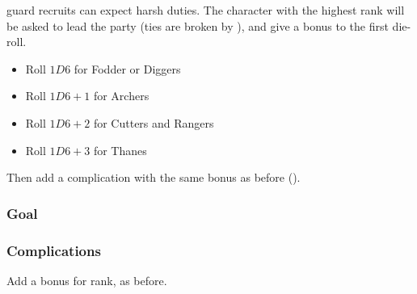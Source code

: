 \begin{multicols}{2}

\noindent
\Gls{guard} recruits can expect harsh duties.
The character with the highest rank will be asked to lead the party (ties are broken by ), and give a bonus to the first die-roll.

\begin{itemize}
  \item
  Roll $1D6$ for Fodder or Diggers
  \item
  Roll $1D6+1$ for Archers
  \item
  Roll $1D6+2$ for Cutters and Rangers
  \item
  Roll $1D6+3$ for Thanes
\end{itemize}

Then add a complication with the same bonus as before ().

\subsubsection{Goal}

\ngMissions

\subsubsection{Complications}

Add a bonus for rank, as before.

\missionComplications

\end{multicols}
